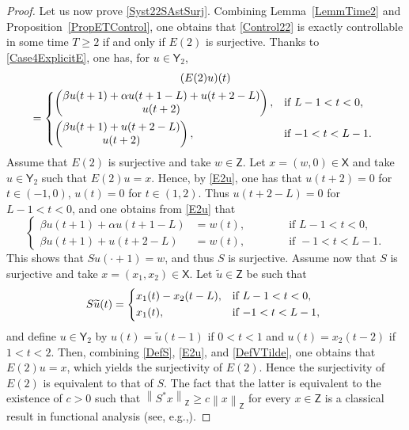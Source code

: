 \documentclass[JEP,XML,SOM,Unicode]{cedram}
\renewcommand{\eg}{e.g.,\xspace}
\theoremstyle{plain}
\theoremstyle{definition}
\newcommand{\norm}[1]{\left\lVert #1\right\lVert}
\begin{document}
\begin{proof}
Let us now prove \eqref{Syst22SAstSurj}. Combining Lemma~\ref{LemmTime2} and Proposition~\ref{PropETControl}, one obtains that \eqref{Control22} is exactly controllable in some time $T \geq 2$ if and only if $E(2)$ is surjective. Thanks to \eqref{Case4ExplicitE}, one has, for $u \in \mathsf Y_2$,\vspace*{-3pt}
\begin{multline}
\label{E2u}
(E(2) u)(t)\\ =
\begin{dcases*}
\begin{pmatrix}
\beta u(t + 1) + \alpha u(t + 1 - L) + u(t + 2 - L) \\
u(t + 2) \\
\end{pmatrix}, & if $L - 1 < t < 0$, \\
\begin{pmatrix}
\beta u(t + 1) + u(t + 2 - L) \\
u(t + 2) \\
\end{pmatrix}, & if $-1 < t < L - 1$.
\end{dcases*}
\end{multline}
Assume that $E(2)$ is surjective and take $w \in \mathsf Z$. Let $x = (w, 0) \in \mathsf X$ and take $u \in \mathsf Y_2$ such that $E(2) u = x$. Hence, by \eqref{E2u}, one has that $u(t + 2) = 0$ for $t \in (-1, 0)$, \ie $u(t) = 0$ for $t \in (1, 2)$. Thus $u(t + 2 - L) = 0$ for $L - 1 < t < 0$, and one obtains from \eqref{E2u} that
\[
\left\{
\begin{aligned}
\beta u(t + 1) + \alpha u(t + 1 - L) & = w(t), & \qquad & \text{ if } L - 1 < t < 0, \\
\beta u(t + 1) + u(t + 2 - L) & = w(t), & & \text{ if } -1 < t < L - 1.
\end{aligned}
\right.
\]
This shows that $S u(\cdot + 1) = w$, and thus $S$ is surjective. Assume now that $S$ is surjective and take $x = (x_1, x_2) \in \mathsf X$. Let $\widetilde u \in \mathsf Z$ be such that
\begin{equation}
\label{DefVTilde}
S \widetilde u(t) =
\begin{dcases*}
x_1(t) - x_2(t - L), & if $L - 1 < t < 0$, \\
x_1(t), & if $-1 < t < L - 1$,
\end{dcases*}
\end{equation}
and define $u \in \mathsf Y_2$ by $u(t) = \widetilde u(t - 1)$ if $0 < t < 1$ and $u(t) = x_2(t - 2)$ if $1 < t < 2$. Then, combining \eqref{DefS}, \eqref{E2u}, and \eqref{DefVTilde}, one obtains that $E(2) u = x$, which yields the surjectivity of $E(2)$. Hence the surjectivity of $E(2)$ is equivalent to that of $S$. The fact that the latter is equivalent to the existence of $c > 0$ such that $\norm{S^\ast x}_{\mathsf Z} \geq c \norm{x}_{\mathsf Z}$ for every $x \in \mathsf Z$ is a classical result in functional analysis (see, \eg \cite[Th.\,4.13]{Rudin1991Functional}).
\end{proof}
\end{document}
